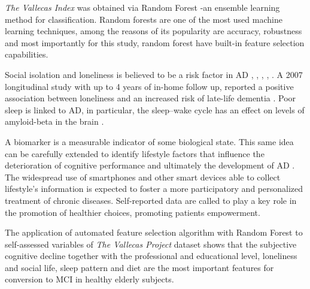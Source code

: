 \documentclass[preprint,12pt]{elsarticle}
\begin{document}

\emph{The Vallecas Index} was obtained via Random Forest -an ensemble learning method for classification. Random forests are one of the most used machine learning techniques, among the reasons of its popularity are accuracy, robustness and most importantly for this study, random forest have built-in feature selection capabilities. 

Social isolation and loneliness is believed to be a risk factor in AD \cite{holmen1992loneliness}, \cite{fratiglioni2000influence}, \cite{shankar2013social}, \cite{holwerda2014feelings}, \cite{evans2018social}. A 2007 longitudinal study with up to 4 years of in-home follow up, reported a positive association between loneliness and an increased risk of late-life dementia \cite{wilson2007loneliness}. Poor sleep is linked to AD, in particular, the sleep–wake cycle has an effect on levels of amyloid-beta in the brain \cite{ju2014sleep}.

A biomarker is a measurable indicator of some biological state. This same idea can be carefully extended to identify lifestyle factors that influence the deterioration of cognitive performance and ultimately the development of AD \cite{ellis2010addressing}. The widespread use of smartphones and other smart devices able to collect lifestyle's information is expected to foster a more participatory and personalized treatment of chronic diseases. Self-reported data are called to play a key role in the promotion of healthier choices, promoting patients empowerment. 

The application of automated feature selection algorithm with Random Forest to self-assessed variables of \emph{The Vallecas Project} dataset shows that the subjective cognitive decline together with the professional and educational level, loneliness and social life, sleep pattern and diet are the most important features for conversion to MCI in healthy elderly subjects.
\end{document}
